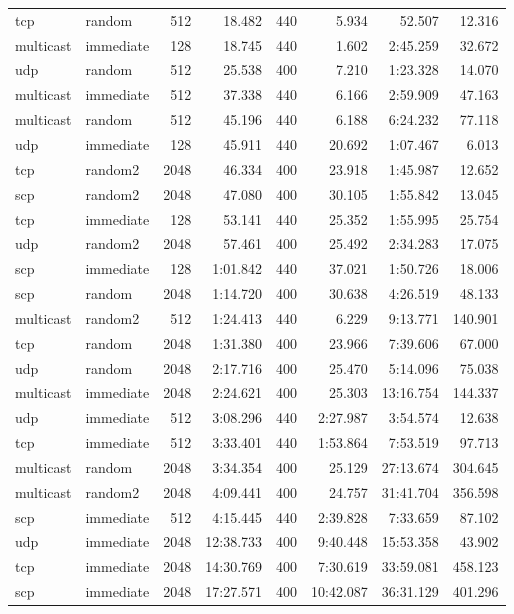 \begin{tabular}{|l|l|r|r|r|r|r|r|}
tcp & random & 512 & 18.482 & 440 & 5.934 & 52.507 & 12.316\\
multicast & immediate & 128 & 18.745 & 440 & 1.602 & 2:45.259 & 32.672\\
udp & random & 512 & 25.538 & 400 & 7.210 & 1:23.328 & 14.070\\
multicast & immediate & 512 & 37.338 & 440 & 6.166 & 2:59.909 & 47.163\\
multicast & random & 512 & 45.196 & 440 & 6.188 & 6:24.232 & 77.118\\
udp & immediate & 128 & 45.911 & 440 & 20.692 & 1:07.467 & 6.013\\
tcp & random2 & 2048 & 46.334 & 400 & 23.918 & 1:45.987 & 12.652\\
scp & random2 & 2048 & 47.080 & 400 & 30.105 & 1:55.842 & 13.045\\
tcp & immediate & 128 & 53.141 & 440 & 25.352 & 1:55.995 & 25.754\\
udp & random2 & 2048 & 57.461 & 400 & 25.492 & 2:34.283 & 17.075\\
scp & immediate & 128 & 1:01.842 & 440 & 37.021 & 1:50.726 & 18.006\\
scp & random & 2048 & 1:14.720 & 400 & 30.638 & 4:26.519 & 48.133\\
multicast & random2 & 512 & 1:24.413 & 440 & 6.229 & 9:13.771 & 140.901\\
tcp & random & 2048 & 1:31.380 & 400 & 23.966 & 7:39.606 & 67.000\\
udp & random & 2048 & 2:17.716 & 400 & 25.470 & 5:14.096 & 75.038\\
multicast & immediate & 2048 & 2:24.621 & 400 & 25.303 & 13:16.754 & 144.337\\
udp & immediate & 512 & 3:08.296 & 440 & 2:27.987 & 3:54.574 & 12.638\\
tcp & immediate & 512 & 3:33.401 & 440 & 1:53.864 & 7:53.519 & 97.713\\
multicast & random & 2048 & 3:34.354 & 400 & 25.129 & 27:13.674 & 304.645\\
multicast & random2 & 2048 & 4:09.441 & 400 & 24.757 & 31:41.704 & 356.598\\
scp & immediate & 512 & 4:15.445 & 440 & 2:39.828 & 7:33.659 & 87.102\\
udp & immediate & 2048 & 12:38.733 & 400 & 9:40.448 & 15:53.358 & 43.902\\
tcp & immediate & 2048 & 14:30.769 & 400 & 7:30.619 & 33:59.081 & 458.123\\
scp & immediate & 2048 & 17:27.571 & 400 & 10:42.087 & 36:31.129 & 401.296\\
\hline
\end{tabular}
